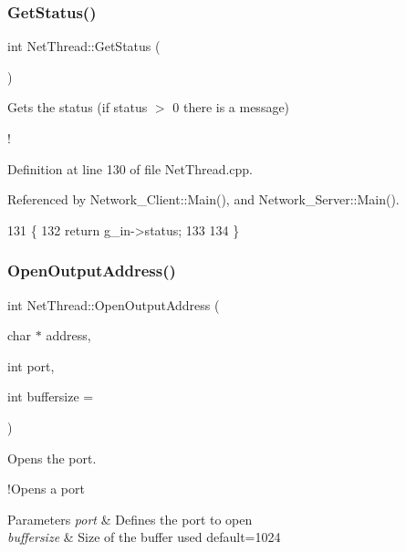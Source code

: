 \subsubsection{\texorpdfstring{Get\+Status()}{GetStatus()}\hspace{0.1cm}{\footnotesize\ttfamily [2/2]}}
{\footnotesize\ttfamily int Net\+Thread\+::\+Get\+Status (\begin{DoxyParamCaption}{ }\end{DoxyParamCaption})}



Gets the status (if status $>$ 0 there is a message) 

! 

Definition at line 130 of file Net\+Thread.\+cpp.



Referenced by Network\+\_\+\+Client\+::\+Main(), and Network\+\_\+\+Server\+::\+Main().


\begin{DoxyCode}
131 \{
132     \textcolor{keywordflow}{return} g\_in->status;
133 
134 \}
\end{DoxyCode}
\mbox{\label{class_net_thread_ac7b31cfc2b1694765fb2c8c17d776f78}} 
\subsubsection{\texorpdfstring{Open\+Output\+Address()}{OpenOutputAddress()}\hspace{0.1cm}{\footnotesize\ttfamily [1/2]}}
{\footnotesize\ttfamily int Net\+Thread\+::\+Open\+Output\+Address (\begin{DoxyParamCaption}\item[{char $\ast$}]{address,  }\item[{int}]{port,  }\item[{int}]{buffersize = {} }\end{DoxyParamCaption})}



Opens the port. 

!\+Opens a port 
\begin{DoxyParams}{Parameters}
{\em port} & Defines the port to open \\
\hline
{\em buffersize} & Size of the buffer used default=1024 \\
\hline
\end{DoxyParams}


